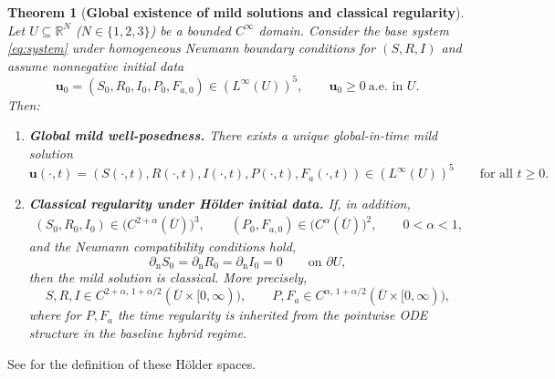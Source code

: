 \documentclass[pdflatex,sn-mathphys-ay]{sn-jnl}
\theoremstyle{thmstyleone}
\newtheorem{theorem}{Theorem}[section]
\theoremstyle{definition}
\theoremstyle{remark}
\begin{document}
\begin{theorem}[\textbf{Global existence of mild solutions and classical regularity}]\citep{rothe2006global}
\label{thm:global}
Let $U\subseteq\mathbb{R}^N$ ($N\in\{1,2,3\}$) be a bounded $C^\infty$ domain. 
Consider the base system \eqref{eq:system} under homogeneous Neumann boundary conditions for $(S,R,I)$ and assume nonnegative initial data
\[
\mathbf u_0=(S_0,R_0,I_0,P_0,F_{a,0})\in (L^\infty(U))^5,
\qquad \mathbf u_0\ge 0 \ \text{a.e.\ in }U.
\]
Then:
\begin{enumerate}[label=(\roman*)]
\item \textbf{Global mild well-posedness.}
There exists a unique global-in-time mild solution
\[
\mathbf u(\cdot,t)=(S(\cdot,t),R(\cdot,t),I(\cdot,t),P(\cdot,t),F_a(\cdot,t))\in (L^\infty(U))^5
\qquad\text{for all }t\ge 0.
\]

\item \textbf{Classical regularity under H\"older initial data.}
If, in addition,
\begin{align}
\label{eq:u_regularity}
(S_0,R_0,I_0)\in \bigl(C^{2+\alpha}(\overline U)\bigr)^3,
\qquad
(P_0,F_{a,0})\in \bigl(C^{\alpha}(\overline U)\bigr)^2,
\qquad 0<\alpha<1,
\end{align}
and the Neumann compatibility conditions hold,
\[
\partial_{\mathrm n}S_0=\partial_{\mathrm n}R_0=\partial_{\mathrm n}I_0=0
\qquad\text{on }\partial U,
\]
then the mild solution is classical. More precisely,
\[
S,R,I \in C^{2+\alpha,\,1+\alpha/2}(\overline{U}\times [0,\infty)),
\qquad 
P,F_a \in C^{\alpha,\,1+\alpha/2}(\overline{U}\times [0,\infty)),
\]
where for $P,F_a$ the time regularity is inherited from the pointwise ODE structure in the baseline hybrid regime.
\end{enumerate}
\end{theorem}

See \citep{ladyzenskaia1968linear} for the definition of these H\"older spaces.
\end{document}
